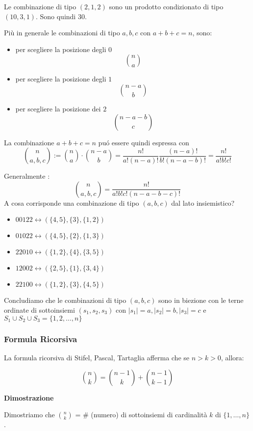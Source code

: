 \documentclass[11pt]{article}
\begin{document}
			Le combinazione di tipo $(2,1,2)$ sono un prodotto condizionato
			di tipo $(10,3,1)$. Sono quindi $30$.

			Pi\`u in generale le combinazioni di tipo $a,b,c$ con $a+b+c=n$,
			sono: \begin{itemize}
				\item per scegliere la posizione degli $0$ \[\binom{n}{a}\]
				\item per scegliere la posizione degli $1$ \[\binom{n-a}{b}\]
				\item per scegliere la posizione dei $2$ \[\binom{n-a-b}{c}\]
			\end{itemize}
			La combinazione $a+b+c=n$ pu\'o essere quindi espressa con
			\[\binom{n}{a , b , c} := \binom{n}{a} \cdot \binom{n-a}{b} =
				\frac{n!}{a!(n-a)!} \frac{(n-a)!}{b!(n-a-b)!} = 
			\frac{n!}{a!b!c!}\] 

			Generalmente :
			\[
				\binom{n}{a,b,c} = \frac{n!}{a! b! c! (n-a-b-c)!}
			\]
			A cosa corrisponde una combinazione di tipo $(a,b,c)$ dal lato
			insiemistico?

			\begin{itemize}
				\item $00122 \longleftrightarrow (\{4,5\}, \{3\}, \{1,2\})$
				\item $01022 \longleftrightarrow (\{4,5\}, \{2\}, \{1,3\})$
				\item $22010 \longleftrightarrow (\{1,2\}, \{4\}, \{3,5\})$
				\item $12002 \longleftrightarrow (\{2,5\}, \{1\}, \{3,4\})$
				\item $22100 \longleftrightarrow (\{1,2\}, \{3\}, \{4,5\})$
			\end{itemize}

			Concludiamo che le combinazioni di tipo $(a,b,c)$ sono in biezione
			con le terne ordinate di sottoinsiemi $(s_1,s_2,s_3)$ con $|s_1| = a
			, |s_2| = b, |s_3| = c$ e $S_1 \cup S_2 \cup S_3 = \{1,2,\ldots,n\}$

			\subsubsection{Formula Ricorsiva}	
			
			La formula ricorsiva di Stifel, Pascal, Tartaglia afferma che
			se $n>k>0$, allora:

			\[
				\binom{n}{k} = \binom{n-1}{k} + \binom{n-1}{k-1}
			\]

			\textbf{\large Dimostrazione}

			Dimostriamo che $\binom{n}{k}$ = \# (numero) di sottoinsiemi di
			cardinalit\`a $k$ di $\{1,\ldots,n\}$.
\end{document}
